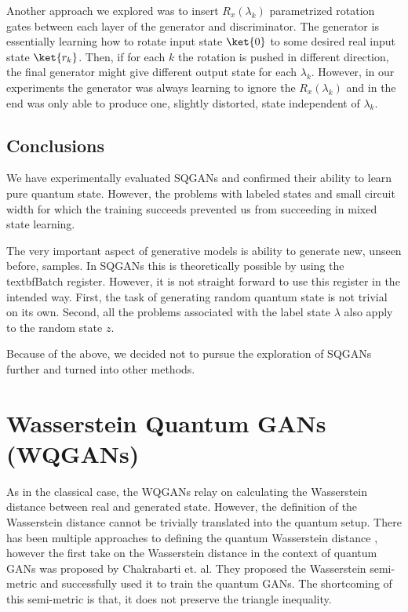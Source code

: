 Another approach we explored was to insert $R_x(\lambda_k)$ parametrized
rotation gates between each layer of the generator and discriminator. The
generator is essentially learning how to rotate input state $\ket{0}$ to some
desired real input state $\ket{r_k}$. Then, if for each $k$ the rotation is
pushed in different direction, the final generator might give different output
state for each $\lambda_k$. However, in our experiments the generator was always
learning to ignore the $R_x(\lambda_k)$ and in the end was only able to produce
one, slightly distorted, state independent of $\lambda_k$.

\subsection{Conclusions}
We have experimentally evaluated SQGANs and confirmed their ability to learn
pure quantum state. However, the problems with labeled states and small
circuit width for which the training succeeds prevented us from succeeding in
mixed state learning.

The very important aspect of generative models is ability to generate new,
unseen before, samples. In SQGANs this is theoretically possible by using the
textbf{Batch} register. However, it is not straight forward to use this register
in the intended way. First, the task of generating random quantum state is not
trivial on its own. Second, all the problems associated with the label state
$\lambda$ also apply to the random state $z$. 

Because of the above, we decided not to pursue the exploration of SQGANs further
and turned into other methods.


\section{Wasserstein Quantum GANs (WQGANs)}

As in the classical case, the WQGANs relay on calculating the Wasserstein
distance between real and generated state. However, the definition of the
Wasserstein distance cannot be trivially translated into the quantum setup.
There has been multiple approaches to defining the quantum Wasserstein distance
\cite{carlen2012analog,chen2016matrix,chen2018Wasserstein,ning2013matrixvalued,peyré2017quantum,golse2021quantum,Golse_2016,yu2019quantum},
however the first take on the Wasserstein distance in the context of quantum
GANs was proposed by Chakrabarti et. al\cite{chakrabarti2019quantum}. They
proposed the Wasserstein semi-metric and successfully used it to train the
quantum GANs. The shortcoming of this semi-metric is that, it does not preserve the
triangle inequality.


